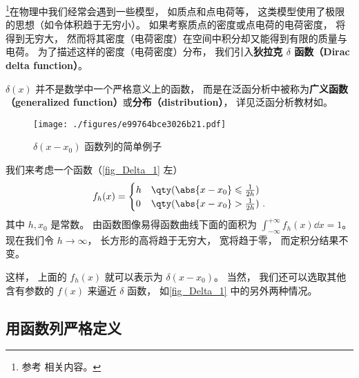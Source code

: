
\footnote{参考 \cite{Arfken} 相关内容。}在物理中我们经常会遇到一些模型， 如质点和点电荷等， 这类模型使用了极限的思想（如令体积趋于无穷小）。 如果考察质点的密度或点电荷的电荷密度， 将得到无穷大， 然而将其密度（电荷密度）在空间中积分却又能得到有限的质量与电荷。 为了描述这样的密度（电荷密度）分布， 我们引入\textbf{狄拉克 $\delta$ 函数（Dirac delta function）}。

$\delta(x)$ 并不是数学中一个严格意义上的函数， 而是在泛函分析中被称为\textbf{广义函数（generalized function）}或\textbf{分布（distribution）}， 详见泛函分析教材如\cite{Zeidler}。

\begin{figure}[ht]
\centering
\texttt{[image: ./figures/e99764bce3026b21.pdf]}
\caption{$\delta(x - x_0)$ 函数列的简单例子} \label{fig_Delta_1}
\end{figure}

我们来考虑一个函数（\autoref{fig_Delta_1} 左）
\begin{equation}\label{eq_Delta_6}
f_h(x) =
\begin{cases}
h & \qty( \abs{x - x_0} \leqslant \frac{1}{2h} )\\
0 & \qty( \abs{x - x_0} > \frac{1}{2h} )~.
\end{cases}
\end{equation}
其中 $h, x_0$ 是常数。 由函数图像易得函数曲线下面的面积为 $\int_{-\infty}^{+\infty} f_h(x) \dd{x} = 1$。 现在我们令 $h \to \infty$， 长方形的高将趋于无穷大， 宽将趋于零， 而定积分结果不变。

这样， 上面的 $f_h(x)$ 就可以表示为 $\delta(x - x_0)$。 当然， 我们还可以选取其他含有参数的 $f(x)$ 来逼近 $\delta$ 函数， 如\autoref{fig_Delta_1} 中的另外两种情况。

\subsection{用函数列严格定义}

